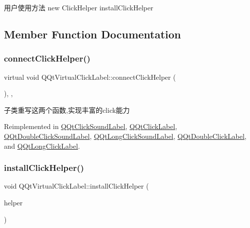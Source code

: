用户使用方法 new Click\+Helper install\+Click\+Helper 

\subsection{Member Function Documentation}
\mbox{\label{class_q_qt_virtual_click_label_a6e008887a4f2d5287e329a53caf8222c}} 
\subsubsection{\texorpdfstring{connect\+Click\+Helper()}{connectClickHelper()}}
{\footnotesize\ttfamily virtual void Q\+Qt\+Virtual\+Click\+Label\+::connect\+Click\+Helper (\begin{DoxyParamCaption}{ }\end{DoxyParamCaption})\hspace{0.3cm}{\ttfamily [inline]}, {\ttfamily [protected]}, {\ttfamily [virtual]}}

子类重写这两个函数,实现丰富的click能力 

Reimplemented in \mbox{\hyperlink{class_q_qt_click_sound_label_a2153c2a44777f2f3a4f22daee2872915}{Q\+Qt\+Click\+Sound\+Label}}, \mbox{\hyperlink{class_q_qt_click_label_af20a13941a73c08287b01642a9e126a9}{Q\+Qt\+Click\+Label}}, \mbox{\hyperlink{class_q_qt_double_click_sound_label_ad87858f08468acc0bac61228d6f3290c}{Q\+Qt\+Double\+Click\+Sound\+Label}}, \mbox{\hyperlink{class_q_qt_long_click_sound_label_a8aed0ec65ec8c51cdc1cceb7c1b115c2}{Q\+Qt\+Long\+Click\+Sound\+Label}}, \mbox{\hyperlink{class_q_qt_double_click_label_a301dbc204a8cfc64e6714dea1aa0b2d6}{Q\+Qt\+Double\+Click\+Label}}, and \mbox{\hyperlink{class_q_qt_long_click_label_a93794ed4256367fc15e5441a4424c595}{Q\+Qt\+Long\+Click\+Label}}.

\mbox{\label{class_q_qt_virtual_click_label_af95dc641c53eda0bbb7d688046f8872d}} 
\subsubsection{\texorpdfstring{install\+Click\+Helper()}{installClickHelper()}}
{\footnotesize\ttfamily void Q\+Qt\+Virtual\+Click\+Label\+::install\+Click\+Helper (\begin{DoxyParamCaption}\item[{\mbox{\hyperlink{class_q_qt_click_helper}{Q\+Qt\+Click\+Helper}} $\ast$}]{helper }\end{DoxyParamCaption})\hspace{0.3cm}{\ttfamily [inline]}}

